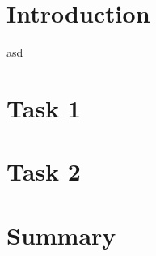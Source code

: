 \documentclass[fleqn,12pt]{article} %
\begin{document}

%


\section{Introduction}
asd


\section{Task 1}


\section{Task 2}


\section{Summary}


%
\end{document}
